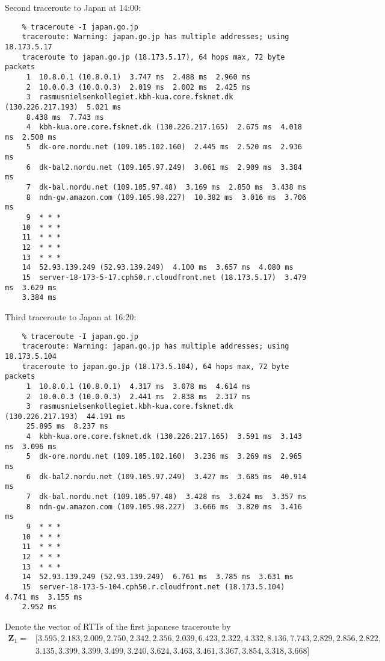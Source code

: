Second traceroute to Japan at 14:00:
\begin{verbatim}
    % traceroute -I japan.go.jp
    traceroute: Warning: japan.go.jp has multiple addresses; using 18.173.5.17
    traceroute to japan.go.jp (18.173.5.17), 64 hops max, 72 byte packets
     1  10.8.0.1 (10.8.0.1)  3.747 ms  2.488 ms  2.960 ms
     2  10.0.0.3 (10.0.0.3)  2.019 ms  2.002 ms  2.425 ms
     3  rasmusnielsenkollegiet.kbh-kua.core.fsknet.dk (130.226.217.193)  5.021 ms  
     8.438 ms  7.743 ms
     4  kbh-kua.ore.core.fsknet.dk (130.226.217.165)  2.675 ms  4.018 ms  2.508 ms
     5  dk-ore.nordu.net (109.105.102.160)  2.445 ms  2.520 ms  2.936 ms
     6  dk-bal2.nordu.net (109.105.97.249)  3.061 ms  2.909 ms  3.384 ms
     7  dk-bal.nordu.net (109.105.97.48)  3.169 ms  2.850 ms  3.438 ms
     8  ndn-gw.amazon.com (109.105.98.227)  10.382 ms  3.016 ms  3.706 ms
     9  * * *
    10  * * *
    11  * * *
    12  * * *
    13  * * *
    14  52.93.139.249 (52.93.139.249)  4.100 ms  3.657 ms  4.080 ms
    15  server-18-173-5-17.cph50.r.cloudfront.net (18.173.5.17)  3.479 ms  3.629 ms  
    3.384 ms
\end{verbatim}
Third traceroute to Japan at 16:20:
\begin{verbatim}
    % traceroute -I japan.go.jp
    traceroute: Warning: japan.go.jp has multiple addresses; using 18.173.5.104
    traceroute to japan.go.jp (18.173.5.104), 64 hops max, 72 byte packets
     1  10.8.0.1 (10.8.0.1)  4.317 ms  3.078 ms  4.614 ms
     2  10.0.0.3 (10.0.0.3)  2.441 ms  2.838 ms  2.317 ms
     3  rasmusnielsenkollegiet.kbh-kua.core.fsknet.dk (130.226.217.193)  44.191 ms  
     25.895 ms  8.237 ms
     4  kbh-kua.ore.core.fsknet.dk (130.226.217.165)  3.591 ms  3.143 ms  3.096 ms
     5  dk-ore.nordu.net (109.105.102.160)  3.236 ms  3.269 ms  2.965 ms
     6  dk-bal2.nordu.net (109.105.97.249)  3.427 ms  3.685 ms  40.914 ms
     7  dk-bal.nordu.net (109.105.97.48)  3.428 ms  3.624 ms  3.357 ms
     8  ndn-gw.amazon.com (109.105.98.227)  3.666 ms  3.820 ms  3.416 ms
     9  * * *
    10  * * *
    11  * * *
    12  * * *
    13  * * *
    14  52.93.139.249 (52.93.139.249)  6.761 ms  3.785 ms  3.631 ms
    15  server-18-173-5-104.cph50.r.cloudfront.net (18.173.5.104)  4.741 ms  3.155 ms  
    2.952 ms
\end{verbatim}
Denote the vector of RTTs of the first japanese traceroute by
\begin{equation*}
\begin{split}
    \mathbf{Z}_1 = &[
        3.595, 2.183, 2.009,
        2.750, 2.342, 2.356,
        2.039, 6.423, 2.322,
        4.332, 8.136, 7.743,
        2.829, 2.856, 2.822, \\
        &3.135, 3.399, 3.399,
        3.499, 3.240, 3.624,
        3.463, 3.461, 3.367,
        3.854, 3.318, 3.668
    ]
\end{split}
\end{equation*}

